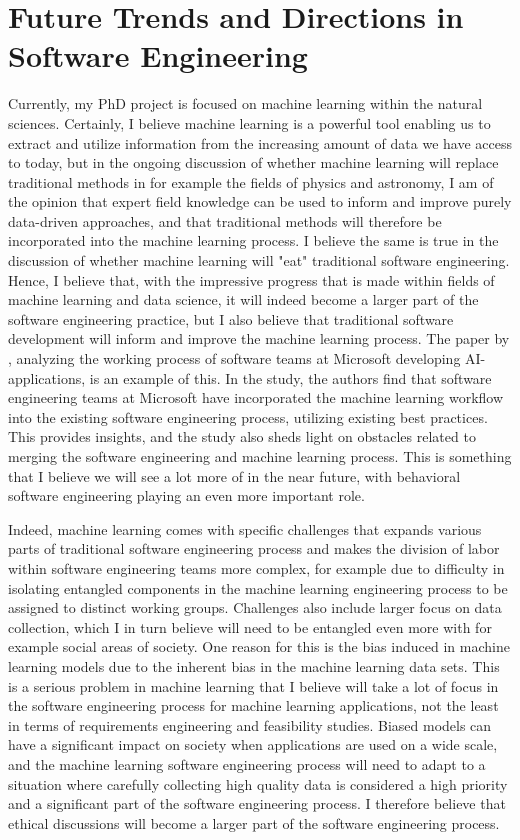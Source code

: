 \documentclass{article}
\begin{document}
\section{Future Trends and Directions in Software Engineering}

Currently, my PhD project is focused on machine learning within the natural sciences. Certainly, I believe machine learning is a powerful tool enabling us to extract and utilize information from the increasing amount of data we have access to today, but in the ongoing discussion of whether machine learning will replace traditional methods in for example the fields of physics and astronomy, I am of the opinion that expert field knowledge can be used to inform and improve purely data-driven approaches, and that traditional methods will therefore be incorporated into the machine learning process. I believe the same is true in the discussion of whether machine learning will "eat" traditional software engineering. Hence, I believe that, with the impressive progress that is made within fields of machine learning and data science, it will indeed become a larger part of the software engineering practice, but I also believe that traditional software development will inform and improve the machine learning process. The paper by \citet{microsoft}, analyzing the working process of software teams at Microsoft developing AI-applications, is an example of this. In the study, the authors find that software engineering teams at Microsoft have incorporated the machine learning workflow into the existing software engineering process, utilizing existing best practices. This provides insights, and the study also sheds light on obstacles related to merging the software engineering and machine learning process. This is something that I believe we will see a lot more of in the near future, with behavioral software engineering playing an even more important role.

Indeed, machine learning comes with specific challenges that expands various parts of traditional software engineering process and makes the division of labor within software engineering teams more complex, for example due to difficulty in isolating entangled components in the machine learning engineering process to be assigned to distinct working groups. Challenges also include larger focus on data collection, which I in turn believe will need to be entangled even more with for example social areas of society. One reason for this is the bias induced in machine learning models due to the inherent bias in the machine learning data sets. This is a serious problem in machine learning that I believe will take a lot of focus in the software engineering process for machine learning applications, not the least in terms of requirements engineering and feasibility studies. Biased models can have a significant impact on society when applications are used on a wide scale, and the machine learning software engineering process will need to adapt to a situation where carefully collecting high quality data is considered a high priority and a significant part of the software engineering process. I therefore believe that ethical discussions will become a larger part of the software engineering process.
\end{document}
